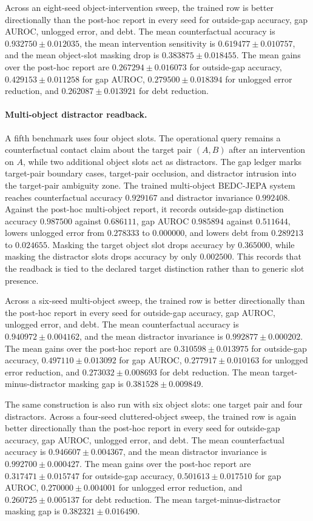 Across an eight-seed object-intervention sweep, the trained row is better
directionally than the post-hoc report in every seed for outside-gap accuracy,
gap AUROC, unlogged error, and debt.  The mean counterfactual accuracy is $0.932750 \pm 0.012035$,
the mean intervention sensitivity is $0.619477 \pm 0.010757$, and the mean
object-slot masking drop is $0.383875 \pm 0.018455$.  The mean gains over the
post-hoc report are $0.267294 \pm 0.016073$ for outside-gap accuracy,
$0.429153 \pm 0.011258$ for gap AUROC, $0.279500 \pm 0.018394$ for unlogged
error reduction, and $0.262087 \pm 0.013921$ for debt reduction.

\paragraph{Multi-object distractor readback.}
A fifth benchmark uses four object slots.  The operational query remains a
counterfactual contact claim about the target pair $(A,B)$ after an
intervention on $A$, while two additional object slots act as distractors.
The gap ledger marks target-pair boundary cases, target-pair occlusion, and
distractor intrusion into the target-pair ambiguity zone.  The trained
multi-object BEDC-JEPA system reaches counterfactual accuracy $0.929167$ and
distractor invariance $0.992408$.  Against the post-hoc multi-object report,
it records outside-gap distinction accuracy $0.987500$ against $0.686111$,
gap AUROC $0.985894$ against $0.511644$, lowers unlogged error from
$0.278333$ to $0.000000$, and lowers debt from $0.289213$ to $0.024655$.
Masking the target object slot drops accuracy by $0.365000$, while masking
the distractor slots drops accuracy by only $0.002500$.  This records that the
readback is tied to the declared target distinction rather than to generic
slot presence.

Across a six-seed multi-object sweep, the trained row is better directionally
than the post-hoc report in every seed for outside-gap accuracy, gap AUROC, unlogged error, and
debt.  The mean counterfactual accuracy is $0.940972 \pm 0.004162$, and the
mean distractor invariance is $0.992877 \pm 0.000202$.  The mean gains over
the post-hoc report are $0.310598 \pm 0.013975$ for outside-gap accuracy,
$0.497110 \pm 0.013092$ for gap AUROC, $0.277917 \pm 0.010163$ for unlogged
error reduction, and $0.273032 \pm 0.008693$ for debt reduction.  The mean
target-minus-distractor masking gap is $0.381528 \pm 0.009849$.

The same construction is also run with six object slots: one target pair and
four distractors.  Across a four-seed cluttered-object sweep, the trained row is
again better directionally than the post-hoc report in every seed for
outside-gap accuracy, gap AUROC, unlogged error, and debt.  The mean counterfactual accuracy is
$0.946607 \pm 0.004367$, and the mean distractor invariance is
$0.992700 \pm 0.000427$.  The mean gains over the post-hoc report are
$0.317471 \pm 0.015747$ for outside-gap accuracy,
$0.501613 \pm 0.017510$ for gap AUROC, $0.270000 \pm 0.004001$ for unlogged
error reduction, and $0.260725 \pm 0.005137$ for debt reduction.  The mean
target-minus-distractor masking gap is $0.382321 \pm 0.016490$.

